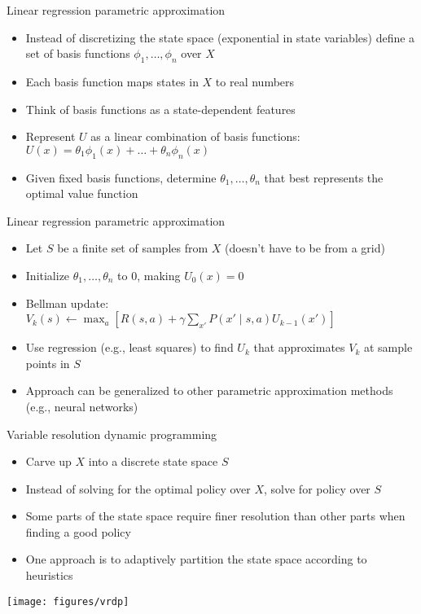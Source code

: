 \documentclass[handout]{dmu}
\begin{document}
\begin{frame}{Linear regression parametric approximation}
\begin{itemize}
\item<1-> Instead of discretizing the state space (exponential in state variables) define a set of \alert<1>{basis functions} $\phi_1, \ldots, \phi_n$ over $X$
\item <2-> Each basis function maps states in $X$ to real numbers
\item <3-> Think of basis functions as a state-dependent features
\item <4-> Represent $U$ as a \alert<4>{linear combination} of basis functions: $U(x) = \theta_1 \phi_1(x) + \ldots + \theta_n \phi_n(x)$
\item <5-> Given fixed basis functions, determine $\theta_1, \ldots, \theta_n$ that best represents the optimal value function
\end{itemize}
\end{frame}

\begin{frame}{Linear regression parametric approximation}
\begin{itemize}
\item<1-> Let $S$ be a finite set of samples from $X$ (doesn't have to be from a grid)
\item <2-> Initialize $\theta_1, \ldots, \theta_n$ to 0, making $U_0(x) = 0$
\item <3-> Bellman update: $V_k(s) \leftarrow \max_a [R(s, a) + \gamma \sum_{x'} P(x' \mid s, a) U_{k-1}(x')]$
\item <4-> Use regression (e.g., least squares) to find $U_k$ that approximates $V_k$ at sample points in $S$
\item <5-> Approach can be generalized to other parametric approximation methods (e.g., neural networks)
\end{itemize}
\end{frame}

\begin{frame}{Variable resolution dynamic programming}
\begin{itemize}
\item<1-> Carve up $X$ into a discrete state space $S$
\item <2-> Instead of solving for the optimal policy over $X$, solve for policy over $S$
\item <3-> Some parts of the state space require \alert<3>{finer resolution} than other parts when finding a good policy
\item <4-> One approach is to \alert<4>{adaptively partition} the state space according to heuristics
\end{itemize}
\vfill
\begin{center}
\texttt{[image: figures/vrdp]}
\end{center}
\end{frame}
\end{document}

